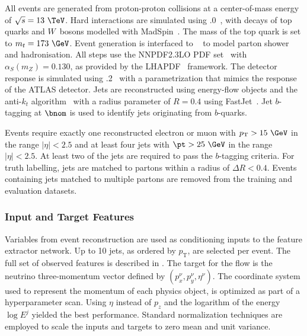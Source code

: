 All events are generated from proton-proton collisions at a center-of-mass energy of $\sqrt{s} = 13~\TeV$.
Hard interactions are simulated using .0~\cite{MadGraph}, with decays of top quarks and $W$~bosons modelled with MadSpin~\cite{MadSpin}.
The mass of the top quark is set to $m_t = 173~\GeV$.
Event generation is interfaced to ~\cite{Pythia8} to model parton shower and hadronisation.
All steps use the \textsc{NNPDF2.3LO} PDF set~\cite{PDF2.3} with $\alpha_S(m_Z) = 0.130$, as provided by the LHAPDF~\cite{LHAPDF6PartonDensity} framework.
The detector response is simulated using .2~\cite{Delphes} with a parametrization that mimics the response of the ATLAS detector.
Jets are reconstructed using energy-flow objects and the anti-$k_t$ algorithm~\cite{AntiKt} with a radius parameter of $R = 0.4$ using FastJet~\cite{FastJet}.
Jet $b$-tagging at $\bnom$ is used to identify jets originating from $b$-quarks.

Events require exactly one reconstructed electron or muon with $p_\mathrm{T} > 15~\GeV$ in the range $|\eta|<2.5$ and at least four jets with $\pt > 25~\GeV$ in the range $|\eta|<2.5$.
At least two of the jets are required to pass the $b$-tagging criteria.
For truth labelling, jets are matched to partons within a radius of $\Delta R < 0.4$.
Events containing jets matched to multiple partons are removed from the training and evaluation datasets.

\subsubsection{Input and Target Features}

Variables from event reconstruction are used as conditioning inputs to the feature extractor network.
Up to 10 jets, as ordered by $p_\mathrm{T}$, are selected per event.
The full set of observed features is described in .
The target for the flow is the neutrino three-momentum vector defined by $(p_x^\nu, p_y^\nu, \eta^\nu )$.
The coordinate system used to represent the momentum of each physics object, is optimized as part of a hyperparameter scan.
Using $\eta$ instead of $p_z$ and the logarithm of the energy $\log E^j$ yielded the best performance.
Standard normalization techniques are employed to scale the inputs and targets to zero mean and unit variance.

